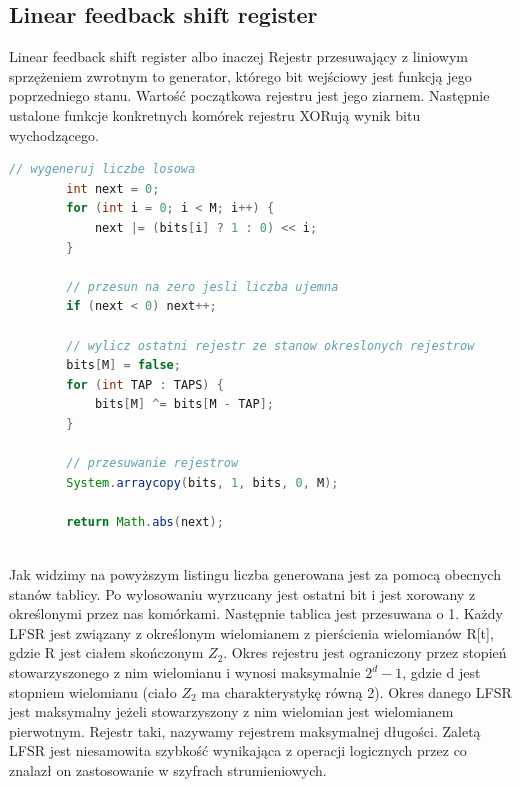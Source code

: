 \documentclass[a4paper, 11pt]{article} %
\begin{document}
\subsection{Linear feedback shift register}
Linear feedback shift register albo inaczej Rejestr przesuwający z liniowym sprzężeniem zwrotnym to generator, którego bit wejściowy jest funkcją jego poprzedniego stanu. Wartość początkowa rejestru jest jego ziarnem. Następnie ustalone funkcje konkretnych komórek rejestru XORują wynik bitu wychodzącego.
\begin{lstlisting}[style=mystyle, language=java, frame=single, caption = generowanie liczby za pomocą LFSR i przesuwanie komórek.] 
        // wygeneruj liczbe losowa
        int next = 0;
        for (int i = 0; i < M; i++) {
            next |= (bits[i] ? 1 : 0) << i;
        }

        // przesun na zero jesli liczba ujemna
        if (next < 0) next++;

        // wylicz ostatni rejestr ze stanow okreslonych rejestrow
        bits[M] = false;
        for (int TAP : TAPS) {
            bits[M] ^= bits[M - TAP];
        }

        // przesuwanie rejestrow
        System.arraycopy(bits, 1, bits, 0, M);

        return Math.abs(next);
    
\end{lstlisting}
Jak widzimy na powyższym listingu liczba generowana jest za pomocą obecnych stanów tablicy. Po wylosowaniu wyrzucany jest ostatni bit i jest xorowany z określonymi przez nas komórkami. Następnie tablica jest przesuwana o 1. \newline
Każdy LFSR jest związany z określonym wielomianem z pierścienia wielomianów R[t], gdzie R jest ciałem skończonym $Z_2$.
Okres rejestru jest ograniczony przez stopień stowarzyszonego z nim wielomianu i wynosi maksymalnie $2^d - 1$, gdzie d jest stopniem wielomianu (ciało ${Z}_2$ ma charakterystykę równą 2). Okres danego LFSR jest maksymalny jeżeli stowarzyszony z nim wielomian jest wielomianem pierwotnym. Rejestr taki, nazywamy rejestrem maksymalnej długości.
\newline Zaletą LFSR jest niesamowita szybkość wynikająca z operacji logicznych przez co znalazł on zastosowanie w szyfrach strumieniowych. 
\end{document}

